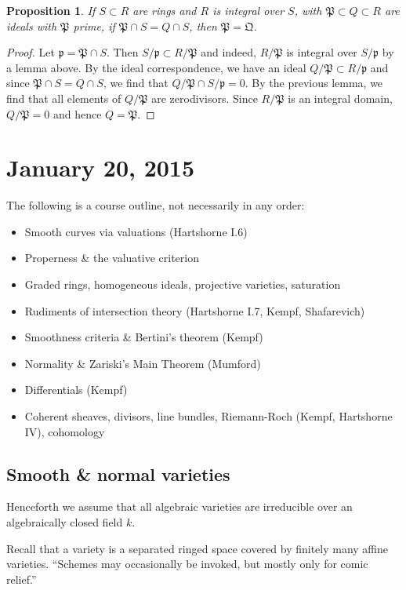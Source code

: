 \documentclass{article}
\newcommand{\fr}{\mathfrak}
\theoremstyle{plain}
\newtheorem{prop}[thm]{Proposition}
\theoremstyle{definition}
\theoremstyle{remark}
\begin{document}
\begin{prop}
    If $S\subset R$ are rings and $R$ is integral over $S$, with $\fr P\subset Q\subset R$
    are ideals with $\fr P$ prime, if $\fr P\cap S=Q\cap S$, then $\fr P=\fr Q$.
\end{prop}
\begin{proof}
    Let $\fr p=\fr P\cap S$. Then $S/\fr p\subset R/\fr P$ and indeed, $R/\fr P$ is integral
    over $S/\fr p$ by a lemma above. By the ideal correspondence, we have an ideal
    $Q/\fr P\subset R/\fr p$ and since $\fr P\cap S=Q\cap S$, we find that $Q/\fr P\cap S/\fr p=0$.
    By the previous lemma, we find that all elements of $Q/\fr P$ are zerodivisors. Since
    $R/\fr P$ is an integral domain, $Q/\fr P=0$ and hence $Q=\fr P$.
\end{proof}

\section*{January 20, 2015}

The following is a course outline, not necessarily in any order:
\begin{itemize}
    \item Smooth curves via valuations (Hartshorne I.6)
    \item Properness \& the valuative criterion
    \item Graded rings, homogeneous ideals, projective varieties, saturation
    \item Rudiments of intersection theory (Hartshorne I.7, Kempf, Shafarevich)
    \item Smoothness criteria \& Bertini's theorem (Kempf)
    \item Normality \& Zariski's Main Theorem (Mumford)
    \item Differentials (Kempf)
    \item Coherent sheaves, divisors, line bundles, Riemann-Roch (Kempf, Hartshorne IV), cohomology
\end{itemize}

\subsection{Smooth \& normal varieties}

Henceforth we assume that all algebraic varieties are irreducible over an
algebraically closed field $k$.

Recall that a variety is a separated ringed space covered by finitely
many affine varieties. ``Schemes may occasionally be invoked, but mostly
only for comic relief.''
\end{document}
